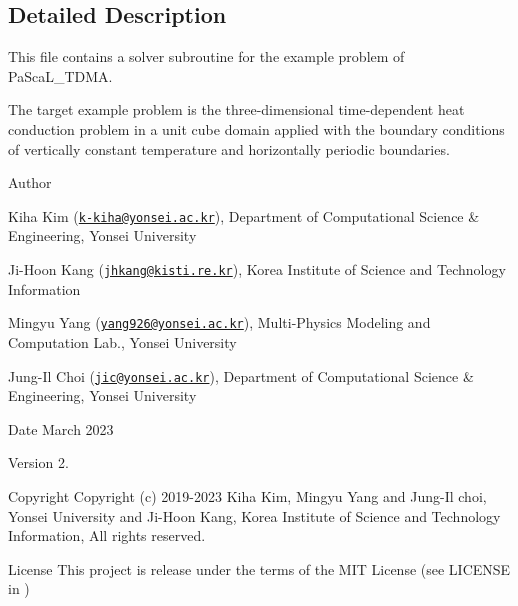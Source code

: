 \subsection{Detailed Description}
This file contains a solver subroutine for the example problem of Pa\+Sca\+L\+\_\+\+T\+D\+MA. 

The target example problem is the three-\/dimensional time-\/dependent heat conduction problem in a unit cube domain applied with the boundary conditions of vertically constant temperature and horizontally periodic boundaries. \begin{DoxyAuthor}{Author}

\begin{DoxyItemize}
\item Kiha Kim (\href{mailto:k-kiha@yonsei.ac.kr}{\tt k-\/kiha@yonsei.\+ac.\+kr}), Department of Computational Science \& Engineering, Yonsei University
\item Ji-\/\+Hoon Kang (\href{mailto:jhkang@kisti.re.kr}{\tt jhkang@kisti.\+re.\+kr}), Korea Institute of Science and Technology Information
\item Mingyu Yang (\href{mailto:yang926@yonsei.ac.kr}{\tt yang926@yonsei.\+ac.\+kr}), Multi-\/\+Physics Modeling and Computation Lab., Yonsei University
\item Jung-\/\+Il Choi (\href{mailto:jic@yonsei.ac.kr}{\tt jic@yonsei.\+ac.\+kr}), Department of Computational Science \& Engineering, Yonsei University
\end{DoxyItemize}
\end{DoxyAuthor}
\begin{DoxyDate}{Date}
March 2023 
\end{DoxyDate}
\begin{DoxyVersion}{Version}
2. 
\end{DoxyVersion}
\begin{DoxyParagraph}{Copyright}
Copyright (c) 2019-\/2023 Kiha Kim, Mingyu Yang and Jung-\/\+Il choi, Yonsei University and Ji-\/\+Hoon Kang, Korea Institute of Science and Technology Information, All rights reserved. 
\end{DoxyParagraph}
\begin{DoxyParagraph}{License }
This project is release under the terms of the M\+IT License (see L\+I\+C\+E\+N\+SE in ) 
\end{DoxyParagraph}
